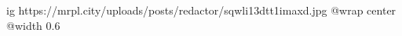  
 
 
 
 

\ifcmt
  ig https://mrpl.city/uploads/posts/redactor/sqwli13dtt1imaxd.jpg
  @wrap center
  @width 0.6
\fi
